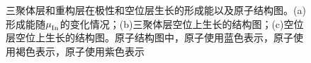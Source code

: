 \begin{figure}[ht]
    \begin{minipage}[b]{0.4\textwidth}
        \newline
    \end{minipage}
    \caption{三聚体层和重构层在极性和空位层生长的形成能以及原子结构图。(a)形成能随$\it \mu_{\rm In}^{\rm } \it$的变化情况；(b)三聚体层空位上生长的结构图；(c)空位层空位上生长的结构图。原子结构图中，原子使用蓝色表示，原子使用褐色表示，原子使用紫色表示}
    \label{fig:IS_2Linsb_InVfirstlayer}
\end{figure}

